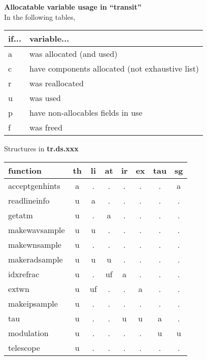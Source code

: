 \documentclass{article}
\begin{document}
\begin{center}
{\large {\bf Allocatable variable usage in ``transit''}}\\[1cm]
In the following tables, \\
\begin{tabular}{ll}
if... & variable...\\
\hline
a & was allocated (and used) \\
c & have components allocated (not exhaustive list) \\
r & was reallocated \\
u & was used \\
p & have non-allocables fields in use \\
f & was freed \\
\end{tabular}
\end{center}

\vspace{1cm}

\begin{center}
{\large Structures in {\bf tr.ds.xxx}}\\[1cm]
\begin{tabular}{l|ccccccc}
function
  & th & li & at & ir & ex & tau & sg \\
\hline 	 	    				 
acceptgenhints			 
  & a  & .  & .  & .  & .  & .   & a  \\
readlineinfo			 
  & u  & a  & .  & .  & .  & .   & .  \\
getatm 	 	    				 
  & u  & .  & a  & .  & .  & .   & .  \\
makewavsample			 
  & u  & u  & .  & .  & .  & .   & .  \\
makewnsample			 
  & u  & .  & .  & .  & .  & .   & .  \\
makeradsample			 
  & u  & u  & u  & .  & .  & .   & .  \\
idxrefrac   			 
  & u  & .  & uf & a  & .  & .   & .  \\
extwn  	 	    				 
  & u  & uf & .  & .  & a  & .   & .  \\
makeipsample			 
  & u  & .  & .  & .  & .  & .   & .  \\
tau    	 	    				 
  & u  & .  & .  & u  & u  & a   & .  \\
modulation  			 
  & u  & .  & .  & .  & .  & u   & u  \\
telescope   			 
  & u  & .  & .  & .  & .  & .   & .  \\
\hline
\end{tabular}
\end{center}
\end{document}
